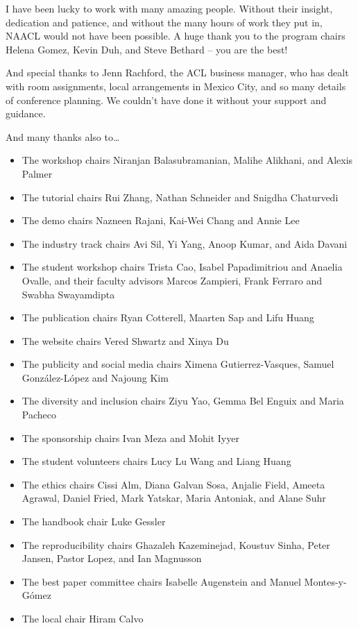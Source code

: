 I have been lucky to work with many amazing people. Without their insight, dedication and patience, and without the many hours of work they put in, NAACL would not have been possible. A huge thank you to the program chairs Helena Gomez, Kevin Duh, and Steve Bethard -- you are the best!

And special thanks to  Jenn Rachford, the ACL business manager, who has dealt with room assignments, local arrangements in Mexico City, and so many details of conference planning. We couldn't have done it without your support and guidance.

And many thanks also to\ldots
\begin{itemize}
\item The workshop chairs Niranjan Balasubramanian, Malihe Alikhani, and Alexis Palmer
\item The tutorial chairs Rui Zhang, Nathan Schneider and Snigdha Chaturvedi
\item The demo chairs Nazneen Rajani, Kai-Wei Chang and Annie Lee 
\item The industry track chairs Avi Sil, Yi Yang, Anoop Kumar, and Aida Davani 
\item The student workshop chairs Trista Cao, Isabel Papadimitriou and Anaelia Ovalle, and their faculty advisors Marcos Zampieri, Frank Ferraro and Swabha Swayamdipta
\item The publication chairs Ryan Cotterell, Maarten Sap and Lifu Huang
\item The website chairs Vered Shwartz and Xinya Du
\item The publicity and social media chairs Ximena Gutierrez-Vasques, Samuel Gonz\'alez-L\'opez and Najoung Kim
\item The diversity and inclusion chairs Ziyu Yao, Gemma Bel Enguix and Maria Pacheco
\item The sponsorship chairs Ivan Meza and Mohit Iyyer
\item The student volunteers chairs Lucy Lu Wang and Liang Huang
\item The ethics chairs Cissi Alm, Diana Galvan Sosa, Anjalie Field, Ameeta Agrawal, Daniel Fried, Mark Yatskar, Maria Antoniak, and Alane Suhr
\item The handbook chair Luke Gessler
\item The reproducibility chairs Ghazaleh Kazeminejad, Koustuv Sinha, Peter Jansen, Pastor Lopez, and Ian Magnusson
\item The best paper committee chairs Isabelle Augenstein and Manuel Montes-y-G\'omez
\item The local chair Hiram Calvo
\end{itemize}

